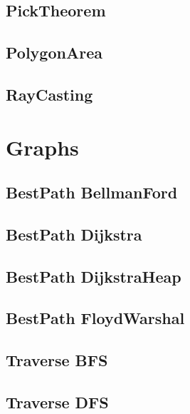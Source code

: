 \subsection{ PickTheorem}
\raggedbottom
\hrulefill
\subsection{ PolygonArea}
\raggedbottom
\hrulefill
\subsection{ RayCasting}
\raggedbottom
\hrulefill

\section{Graphs}
\subsection{BestPath BellmanFord}
\raggedbottom
\hrulefill
\subsection{BestPath Dijkstra}
\raggedbottom
\hrulefill
\subsection{BestPath DijkstraHeap}
\raggedbottom
\hrulefill
\subsection{BestPath FloydWarshal}
\raggedbottom
\hrulefill
\subsection{Traverse BFS}
\raggedbottom
\hrulefill
\subsection{Traverse DFS}
\raggedbottom
\hrulefill

